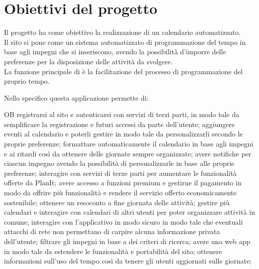 \section{Obiettivi del progetto}
\label{sec:ObiettiviProgetto}
Il progetto ha come obiettivo la realizzazione di un calendario automatizzato.\\
Il sito si pone come un sistema automatizzato di programmazione del tempo in base agli impegni che si inseriscono, avendo la possibilità d'imporre delle preferenze per la disposizione delle attività da svolgere.\\
La funzione principale di \nome è la facilitazione del processo di programmazione del proprio tempo.

\vspace{0.5cm}

Nello specifico questa applicazione permette di:
\begin {listaPersonale} {OB}
       registrarsi al sito e autenticarsi con servizi di terzi parti, in modo tale da semplificare la registrazione e futuri accessi da parte dell'utente;
       aggiungere eventi al calendario e poterli gestire in modo tale da personalizzarli secondo le proprie preferenze;
       formattare automaticamente il calendario in base agli impegni e ai ritardi così da ottenere delle giornate sempre organizzate;
       avere notifiche per ciascun impegno avendo la possibilità di personalizzarle in base alle proprie preferenze;
       interagire con servizi di terze parti per aumentare le funzionalità offerte da PlanIt;
       avere accesso a funzioni premium e gestirne il pagamento in modo da offrire più funzionalità e rendere il servizio offerto economicamente sostenibile;
       ottenere un resoconto a fine giornata delle attività;
       gestire più calendari e interagire con calendari di altri utenti per poter organizzare attività in comune;
       interagire con l'applicativo in modo sicuro in modo tale che eventuali attacchi di rete non permettano di carpire alcuna informazione privata dell'utente;
       filtrare gli impegni in base a dei criteri di ricerca;
       avere una web app in modo tale da estendere le funzionalità e portabilità del sito;
       ottenere informazioni sull'uso del tempo così da tenere gli utenti aggiornati sulle giornate;
\end{listaPersonale}
